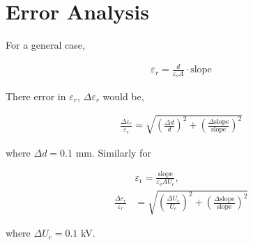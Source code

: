 \section{Error Analysis}
For a general case,

\begin{align*}
    \varepsilon_r = \frac{d}{\varepsilon_oA} \cdot \text{slope}
\end{align*}

There error in $\varepsilon_r$, $\Delta \varepsilon_r$ would be,

\begin{align}
    \frac{\Delta \varepsilon_r}{\varepsilon_r} = \sqrt{\left(\frac{\Delta d}{d}\right)^2 + \left(\frac{\Delta \text{slope}}{\text{slope}}\right)^2}
\end{align}

where $\Delta d = 0.1$ mm. Similarly for

\begin{align}
    &\varepsilon_\text{r} = \frac{\text{slope}}{\varepsilon_oAU_c} , \nonumber\\
    \frac{\Delta \varepsilon_r}{\varepsilon_r} &= \sqrt{\left(\frac{\Delta U_c}{U_c}\right)^2 + \left(\frac{\Delta \text{slope}}{\text{slope}}\right)^2}
\end{align}

where $\Delta U_c = 0.1$ kV.\\


